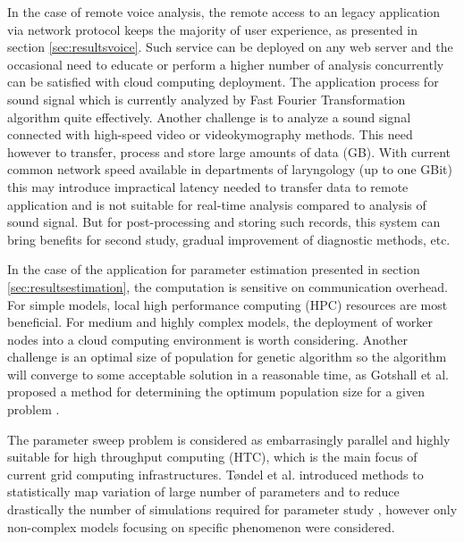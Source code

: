 In the case of remote voice analysis, the remote access to an legacy application via network protocol keeps the majority of user experience, as presented in section \ref{sec:resultsvoice}. Such service can be deployed on any web server and the occasional need to educate or perform a higher number of analysis concurrently can be satisfied with cloud computing deployment. The application process for sound signal which is currently analyzed by Fast Fourier Transformation algorithm quite effectively. Another challenge is to analyze a sound signal connected with high-speed video or videokymography methods. This need however to transfer, process and store large amounts of data (GB). With current common network speed available in departments of laryngology (up to one GBit) this may introduce impractical latency needed to transfer data to remote application and is not suitable for real-time analysis compared to analysis of sound signal. But for post-processing and storing such records, this system can bring benefits for second study, gradual improvement of diagnostic methods, etc.  

In the case of the application for parameter estimation presented in section \ref{sec:resultsestimation}, the computation is sensitive on communication overhead. For simple models, local high performance computing (HPC) resources are most beneficial. For medium and highly complex models, the deployment of worker nodes into a cloud computing environment is worth considering. Another challenge is an optimal size of population for genetic algorithm so the algorithm will converge to some acceptable solution in a reasonable time, as Gotshall et al. proposed a method for determining the optimum population size for a given problem \cite{Gotshall2000}.

The parameter sweep problem is considered as embarrasingly parallel and highly suitable for high throughput computing (HTC), which is the main focus of current grid computing infrastructures. Tøndel et al. introduced methods to statistically map variation of large number of parameters and to reduce drastically the number of simulations required for  parameter study \cite{Tondel2011}, however only non-complex models focusing on specific phenomenon were considered.

